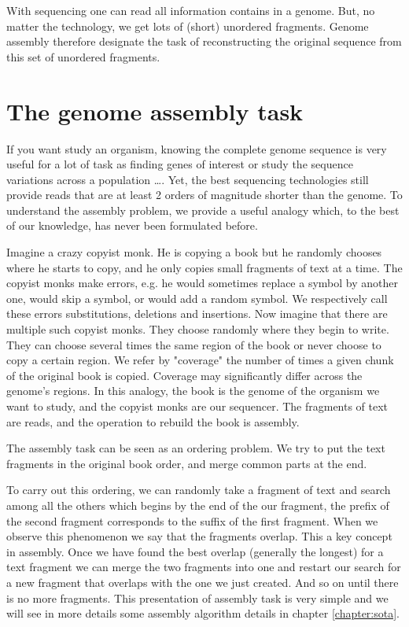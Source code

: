 \documentclass[./main.tex]{subfiles}
\begin{document}
With sequencing one can read all information contains in a genome. But, no matter the technology, we get lots of (short) unordered fragments. Genome assembly therefore designate the task of reconstructing the original sequence from this set of unordered fragments.%

\section{The genome assembly task}

If you want study an organism, knowing the complete genome sequence is very useful for a lot of task as finding 
genes of interest or study the sequence variations across a population \ldots.%
Yet, the best sequencing technologies still provide reads that are at least 2 orders of magnitude shorter than the genome. To understand the assembly problem, we provide a useful analogy which, to the best of our knowledge, has never been formulated before.

Imagine a crazy copyist monk. He is copying a book but he randomly chooses where he starts to copy, and he only copies small fragments of text at a time.
The copyist monks make errors, e.g. he would sometimes replace a symbol by another one, would skip a symbol, or would add a random symbol. We respectively call these errors substitutions, deletions and insertions.
Now imagine that there are multiple such copyist monks.
They choose randomly where they begin to write. They can choose several times the same region of the book or never choose to copy a certain region.
We refer by "coverage" the number of times a given chunk of the original book is copied. Coverage may significantly differ across the genome's regions.%
In this analogy, the book is the genome of the organism we want to study, and the copyist monks are our sequencer. The fragments of text are reads, and the operation to rebuild the book is assembly.

The assembly task can be seen as an ordering problem.%
We try to put the text fragments in the original book order, and merge common parts at the end.%

To carry out this ordering, we can randomly take a fragment of text and search among all the others which begins by the end of the our fragment, the prefix of the second fragment corresponds to the suffix of the first fragment. When we observe this phenomenon we say that the fragments overlap. This a key concept in assembly. Once we have found the best overlap (generally the longest) for a text fragment we can merge the two fragments into one and restart our search for a new fragment that overlaps with the one we just created. And so on until there is no more fragments. This presentation of assembly task is very simple and we will see in more details some assembly algorithm details in chapter \ref{chapter:sota}.
\end{document}
